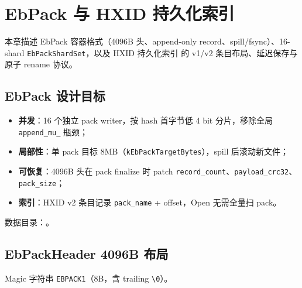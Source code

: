 \chapter{EbPack 与 HXID 持久化索引}
\label{ch:ebpack-index}

本章描述 EbPack 容器格式（4096B 头、append-only record、spill/fsync）、16-shard \texttt{EbPackShardSet}，以及 HXID 持久化索引  的 v1/v2 条目布局、延迟保存与原子 rename 协议。

\section{EbPack 设计目标}

\begin{designbox}
\begin{itemize}[nosep]
  \item \textbf{并发}：16 个独立 pack writer，按 hash 首字节低 4 bit 分片，移除全局 \texttt{append\_mu\_} 瓶颈；
  \item \textbf{局部性}：单 pack 目标 8MB（\texttt{kEbPackTargetBytes}），spill 后滚动新文件；
  \item \textbf{可恢复}：4096B 头在 pack finalize 时 patch \texttt{record\_count}、\texttt{payload\_crc32}、\texttt{pack\_size}；
  \item \textbf{索引}：HXID v2 条目记录 \texttt{pack\_name} + offset，Open 无需全量扫 pack。
\end{itemize}
\end{designbox}

数据目录：。

\section{EbPackHeader 4096B 布局}

Magic 字符串 \texttt{EBPACK1}（8B，含 trailing \texttt{\textbackslash0}）。

